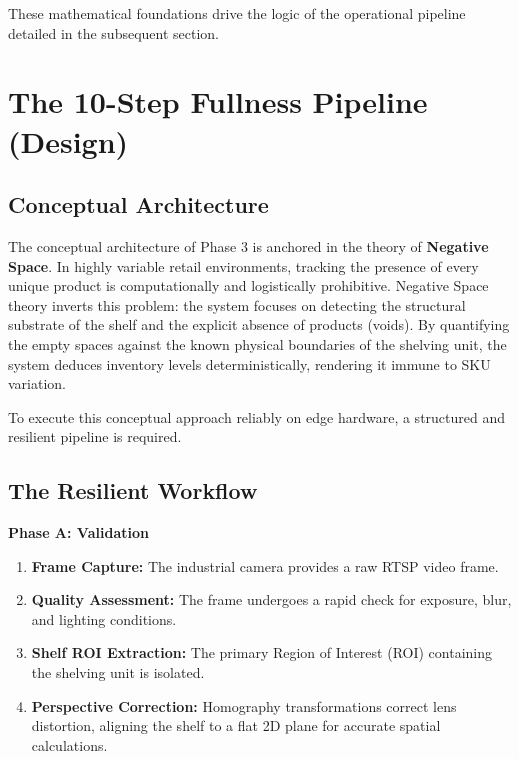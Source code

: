 These mathematical foundations drive the logic of the operational pipeline detailed in the subsequent section.

\section{The 10-Step Fullness Pipeline (Design)}

\subsection{Conceptual Architecture}
The conceptual architecture of Phase 3 is anchored in the theory of \textbf{Negative Space}. In highly variable retail environments, tracking the presence of every unique product is computationally and logistically prohibitive. Negative Space theory inverts this problem: the system focuses on detecting the structural substrate of the shelf and the explicit absence of products (voids). By quantifying the empty spaces against the known physical boundaries of the shelving unit, the system deduces inventory levels deterministically, rendering it immune to SKU variation.

To execute this conceptual approach reliably on edge hardware, a structured and resilient pipeline is required.

\subsection{The Resilient Workflow}

\textbf{Phase A: Validation}
\begin{enumerate}
    \item \textbf{Frame Capture:} The industrial camera provides a raw RTSP video frame.
    \item \textbf{Quality Assessment:} The frame undergoes a rapid check for exposure, blur, and lighting conditions.
    \item \textbf{Shelf ROI Extraction:} The primary Region of Interest (ROI) containing the shelving unit is isolated.
    \item \textbf{Perspective Correction:} Homography transformations correct lens distortion, aligning the shelf to a flat 2D plane for accurate spatial calculations.
\end{enumerate}

